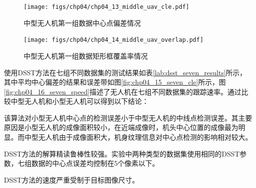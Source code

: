 \begin{figure}[ht]   
	\centering
	\texttt{[image: figs/chp04/chp04\_13\_middle\_uav\_cle.pdf]}
	\caption{中型无人机第一组数据中心点偏差情况}
	\label{fig:chp04_13_middle_uav_cle}
\end{figure}

\begin{figure}[ht]   
	\centering
	\texttt{[image: figs/chp04/chp04\_14\_middle\_uav\_overlap.pdf]}
	\caption{中型无人机第一组数据矩形框覆盖率情况}
	\label{fig:chp04_14_middle_uav_overlap}
\end{figure}

使用DSST方法在七组不同数据集的测试结果如表\ref{lab:dsst_seven_results}所示，其中平均中心偏差的结果和误差带如图\ref{fig:chp04_15_seven_cle}所示，图\ref{fig:chp04_16_seven_speed}描述了无人机在七组不同数据集的跟踪速率。通过比较中型无人机和小型无人机可以得到以下结论：
\begin{compactenum}
	\item 该算法对小型无人机中心点的检测误差小于中型无人机的中线点检测误差。其主要原因是小型无人机的成像面积较小，在近端成像时，机头中心位置的成像最为明显。而中型无人机由于成像面积大，机身纹理信息对中心点检测的影响相对较大。
	\item DSST方法的解算精读鲁棒性较强。实验中两种类型的数据集使用相同的DSST参数，七组数据的中心点误差均控制在5个像素以下。	
	\item DSST方法的速度严重受制于目标图像尺寸。
\end{compactenum}

